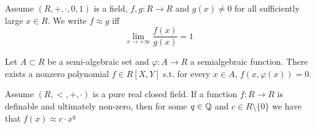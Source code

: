 \documentclass[11pt]{article}
\begin{document}
\begin{definition}[]
Assume \((R,+,\cdot,0,1)\) is a field, \(f,g:R\to R\) and \(g(x)\neq 0\) for all sufficiently
large \(x\in R\). We write \(f\approx g\) iff
\begin{equation*}
\lim_{x\to+\infty}\frac{f(x)}{g(x)}=1
\end{equation*}
\end{definition}

\begin{lemma}
\label{B2.5.2}
Let \(A\subset R\) be a semi-algebraic set and \(\varphi:A\to R\) a semialgebraic function. There exists a
nonzero polynomial \(f\in R[X,Y]\) s.t. for every \(x\in A\), \(f(x,\varphi(x))=0\).
\end{lemma}

\begin{lemma}[3.5.5]
\label{3.5.5}
Assume \((R,<,+,\cdot)\) is a pure real closed field. If a function \(f:R\to R\) is definable and
ultimately non-zero, then for some \(q\in\mathbb{Q}\) and \(c\in R\setminus\{0\}\) we have that \(f(x)\approx c\cdot x^q\)
\end{lemma}
\end{document}

